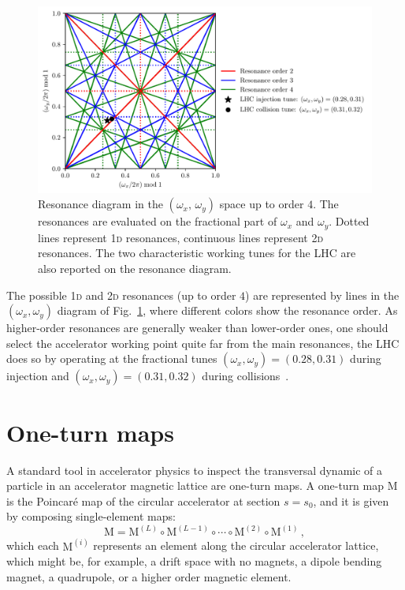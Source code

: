 \begin{figure}
	\centering
	\includegraphics[width=.85\textwidth]{2_accelerator_physics_fundamentals/figs/tune_space.pdf}
	\caption{Resonance diagram in the $(\omega_x,\,\omega_y)$ space up to order $4$. The resonances are evaluated on the fractional part of $\omega_x$ and $\omega_y$. Dotted lines represent 1\textsc{d} resonances, continuous lines represent 2\textsc{d} resonances. The two characteristic working tunes for the LHC are also reported on the resonance diagram.}
	\label{fig:res}
\end{figure}

The possible 1\textsc{d} and 2\textsc{d} resonances (up to order $4$) are represented by lines in the $(\omega_x, \omega_y)$ diagram of Fig.~\ref{fig:res}, where different colors show the resonance order. As higher-order resonances are generally weaker than lower-order ones, one should select the accelerator working point quite far from the main resonances, the LHC does so by operating at the fractional tunes $(\omega_x, \omega_y)=(0.28, 0.31)$ during injection and $(\omega_x, \omega_y)=(0.31, 0.32)$ during collisions~\cite{Benedikt:823808}.

\section{One-turn maps}

A standard tool in accelerator physics to inspect the transversal dynamic of a particle in an accelerator magnetic lattice are one-turn maps. A one-turn map \(\mathrm{M}\) is the Poincaré map of the circular accelerator at section \(s = s_0\), and it is given by composing single-element maps:
\begin{equation}
	\mathrm{M} = \mathrm{M}^{(L)} \circ \mathrm{M}^{(L - 1)} \circ \cdots \circ \mathrm{M}^{(2)} \circ \mathrm{M}^{(1)} \,,
\end{equation}
which each $\mathrm{M}^{(i)}$ represents an element along the circular accelerator lattice, which might be, for example, a drift space with no magnets, a dipole bending magnet, a quadrupole, or a higher order magnetic element. 

